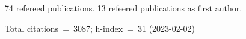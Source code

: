 74 refereed publications. 13 refeered publications as first author.

Total citations~=~3087; h-index~=~31 (2023-02-02)